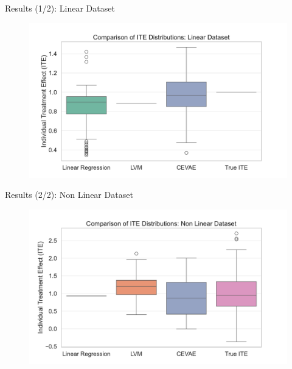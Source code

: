 \documentclass[10pt]{beamer}
\begin{document}
\begin{frame}{Results (1/2): Linear Dataset}
    \begin{figure}[H]
      \includegraphics[width=\textwidth]{../src/results/boxplot_linear.pdf}
    \end{figure}
\end{frame}

\begin{frame}{Results (2/2): Non Linear Dataset}
    \begin{figure}[H]
      \includegraphics[width=\textwidth]{../src/results/boxplot_non_linear.pdf}
    \end{figure}
\end{frame}
\end{document}

